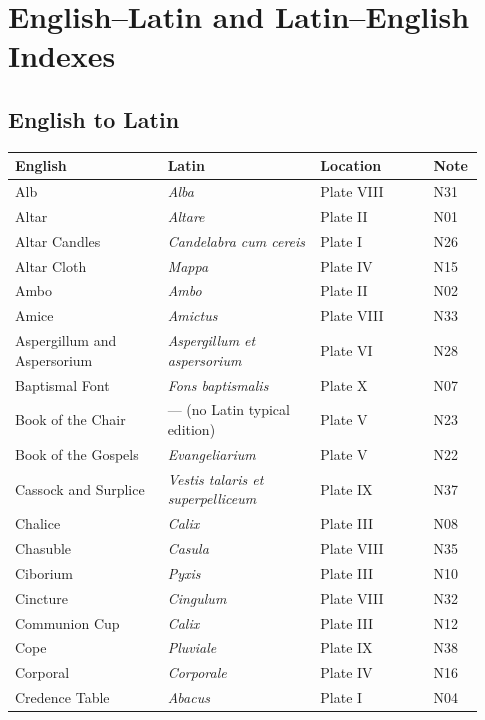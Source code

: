 \clearpage
\section{English--Latin and Latin--English Indexes}
\subsection*{English to Latin}
{\footnotesize\begin{longtable}{>{\raggedright\arraybackslash}p{0.31\linewidth}>{\raggedright\arraybackslash}p{0.31\linewidth}>{\raggedright\arraybackslash}p{0.23\linewidth}>{\raggedright\arraybackslash}p{0.08\linewidth}}
\toprule
\textbf{English} & \textbf{Latin} & \textbf{Location} & \textbf{Note} \\
\midrule
\endhead
Alb & \textit{Alba} & Plate VIII & N31 \\
Altar & \textit{Altare} & Plate II & N01 \\
Altar Candles & \textit{Candelabra cum cereis} & Plate I & N26 \\
Altar Cloth & \textit{Mappa} & Plate IV & N15 \\
Ambo & \textit{Ambo} & Plate II & N02 \\
Amice & \textit{Amictus} & Plate VIII & N33 \\
Aspergillum and Aspersorium & \textit{Aspergillum et aspersorium} & Plate VI & N28 \\
Baptismal Font & \textit{Fons baptismalis} & Plate X & N07 \\
Book of the Chair & --- (no Latin typical edition) & Plate V & N23 \\
Book of the Gospels & \textit{Evangeliarium} & Plate V & N22 \\
Cassock and Surplice & \textit{Vestis talaris et superpelliceum} & Plate IX & N37 \\
Chalice & \textit{Calix} & Plate III & N08 \\
Chasuble & \textit{Casula} & Plate VIII & N35 \\
Ciborium & \textit{Pyxis} & Plate III & N10 \\
Cincture & \textit{Cingulum} & Plate VIII & N32 \\
Communion Cup & \textit{Calix} & Plate III & N12 \\
Cope & \textit{Pluviale} & Plate IX & N38 \\
Corporal & \textit{Corporale} & Plate IV & N16 \\
Credence Table & \textit{Abacus} & Plate I & N04 \\

\end{longtable}}
